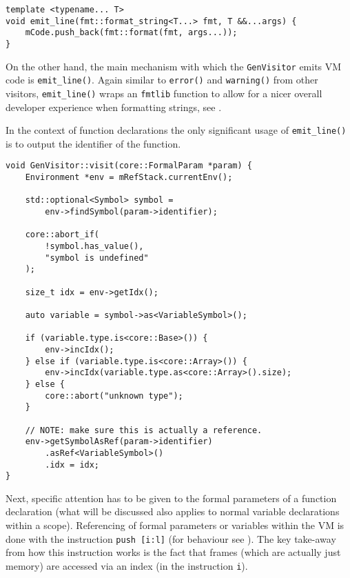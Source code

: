 \begin{lstlisting}[caption={The \texttt{emit\_line()} method in
the \texttt{GenVisitor} class (ir\_gen/GenVisitor.cpp)},
label=lst:emitline]
template <typename... T>
void emit_line(fmt::format_string<T...> fmt, T &&...args) {
    mCode.push_back(fmt::format(fmt, args...));
}
\end{lstlisting}

On the other hand, the main mechanism with which the
\texttt{GenVisitor} emits VM code is \texttt{emit\_line()}.
Again similar to \texttt{error()} and \texttt{warning()} from
other visitors, \texttt{emit\_line()} wraps an \texttt{fmtlib}
function to allow for a nicer overall developer experience when
formatting strings, see .

In the context of function declarations the only significant
usage of \texttt{emit\_line()} is to output the identifier of
the function.


\begin{lstlisting}[caption={The \texttt{visit(FormalParam *)}
method in the \texttt{GenVisitor} class
(ir\_gen/GenVisitor.cpp)}, label=lst:formalparam]
void GenVisitor::visit(core::FormalParam *param) {
    Environment *env = mRefStack.currentEnv();

    std::optional<Symbol> symbol =
        env->findSymbol(param->identifier);

    core::abort_if(
        !symbol.has_value(),
        "symbol is undefined"
    );

    size_t idx = env->getIdx();

    auto variable = symbol->as<VariableSymbol>();

    if (variable.type.is<core::Base>()) {
        env->incIdx();
    } else if (variable.type.is<core::Array>()) {
        env->incIdx(variable.type.as<core::Array>().size);
    } else {
        core::abort("unknown type");
    }

    // NOTE: make sure this is actually a reference.
    env->getSymbolAsRef(param->identifier)
        .asRef<VariableSymbol>()
        .idx = idx;
}
\end{lstlisting}

Next, specific attention has to be given to the formal
parameters of a function declaration (what will be discussed
also applies to normal variable declarations within a scope).
Referencing of formal parameters or variables within the VM is
done with the instruction \mbox{\texttt{push [i:l]}} (for
behaviour see ). The key take-away from how
this instruction works is the fact that frames (which are
actually just memory) are accessed via an index (in the
instruction \texttt{i}).

